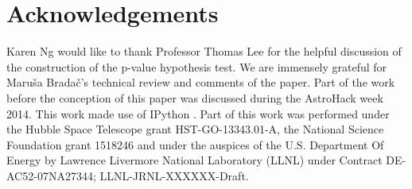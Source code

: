 \section{Acknowledgements}
Karen Ng would like to thank Professor Thomas Lee for the helpful discussion of 
the construction of the p-value hypothesis test. We are immensely grateful for 
Maru\v{s}a Brada\v{c}'s technical review and comments of the paper.  
Part of the work before the conception of this paper was discussed during 
the AstroHack week 2014. This work made use of {\sc IPython}
\citep{Perez2007}.
Part of this work was performed under the Hubble Space Telescope grant
HST-GO-13343.01-A, the National Science Foundation grant 
1518246 and under the auspices of the U.S. Department Of Energy by 
Lawrence Livermore National Laboratory (LLNL) 
under Contract DE-AC52-07NA27344; 
LLNL-JRNL-XXXXXX-Draft.
% 
% 
% 
% 
% 
% 
% 

